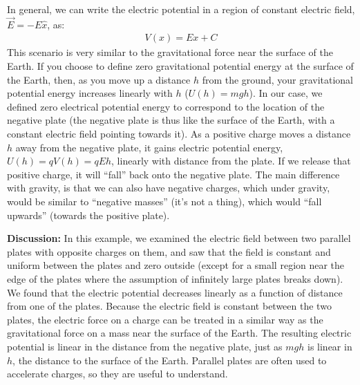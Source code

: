 \begin{example}
In general, we can write the electric potential in a region of constant electric field, $\vec E=-E\hat x$, as:
\begin{align*}
V(x)=Ex + C
\end{align*} 
This scenario is very similar to the gravitational force near the surface of the Earth. If you choose to define zero gravitational potential energy at the surface of the Earth, then, as you move up a distance $h$ from the ground, your gravitational potential energy increases linearly with $h$ ($U(h)=mgh$). In our case, we defined zero electrical potential energy to correspond to the location of the negative plate (the negative plate is thus like the surface of the Earth, with a constant electric field pointing towards it). As a positive charge moves a distance $h$ away from the negative plate, it gains electric potential energy, $U(h)=qV(h)=qEh$, linearly with distance from the plate. If we release that positive charge, it will ``fall'' back onto the negative plate. The main difference with gravity, is that we can also have negative charges, which under gravity, would be similar to ``negative masses'' (it's not a thing), which would ``fall upwards'' (towards the positive plate).  

\textbf{Discussion:} In this example, we examined the electric field between two parallel plates with opposite charges on them, and saw that the field is constant and uniform between the plates and zero outside (except for a small region near the edge of the plates where the assumption of infinitely large plates breaks down). We found that the electric potential decreases linearly as a function of distance from one of the plates. Because the electric field is constant between the two plates, the electric force on a charge can be treated in a similar way as the gravitational force on a mass near the surface of the Earth. The resulting electric potential is linear in the distance from the negative plate, just as $mgh$ is linear in $h$, the distance to the surface of the Earth. Parallel plates are often used to accelerate charges, so they are useful to understand. 
\end{example}


